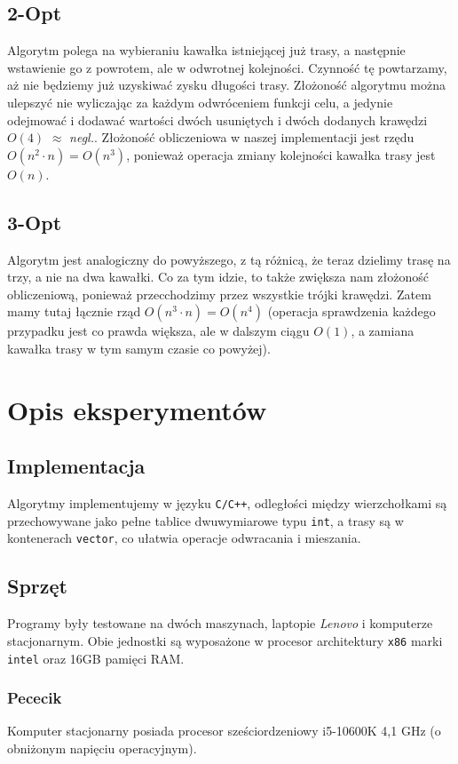 \documentclass{article}
\begin{document}
\subsection{2-Opt}
Algorytm polega na wybieraniu kawałka istniejącej już trasy, a następnie wstawienie go z powrotem, ale w odwrotnej kolejności. Czynność tę powtarzamy, aż nie będziemy już uzyskiwać zysku długości trasy. Złożoność algorytmu można ulepszyć nie wyliczając za każdym odwróceniem funkcji celu, a jedynie odejmować i dodawać wartości dwóch usuniętych i dwóch dodanych krawędzi $O(4)$ $\approx$ \textit{negl.}. Złożoność obliczeniowa w naszej implementacji jest rzędu $O(n^2\cdot n) = O(n^3)$, ponieważ operacja zmiany kolejności kawałka trasy jest $O(n)$.

\subsection{3-Opt}
Algorytm jest analogiczny do powyższego, z tą różnicą, że teraz dzielimy trasę na trzy, a nie na dwa kawałki. Co za tym idzie, to także zwiększa nam złożoność obliczeniową, ponieważ przecchodzimy przez wszystkie trójki krawędzi. Zatem mamy tutaj łącznie rząd $O(n^3\cdot n) = O(n^4)$ (operacja sprawdzenia każdego przypadku jest co prawda większa, ale w dalszym ciągu $O(1)$, a zamiana kawałka trasy w tym samym czasie co powyżej).

\section{Opis eksperymentów}
\subsection{Implementacja}
Algorytmy implementujemy w języku \texttt{C/C++}, odległości między wierzchołkami są przechowywane jako pełne tablice dwuwymiarowe typu \texttt{int}, a trasy są w kontenerach \texttt{vector}, co ułatwia operacje odwracania i mieszania.

\subsection{Sprzęt}
Programy były testowane na dwóch maszynach, laptopie \textit{Lenovo} i komputerze stacjonarnym. Obie jednostki są wyposażone w procesor architektury \texttt{x86} marki \texttt{intel} oraz 16GB pamięci RAM.

\subsubsection{Pececik}
Komputer stacjonarny posiada procesor sześciordzeniowy i5-10600K 4,1 GHz (o obniżonym napięciu operacyjnym).
\end{document}
